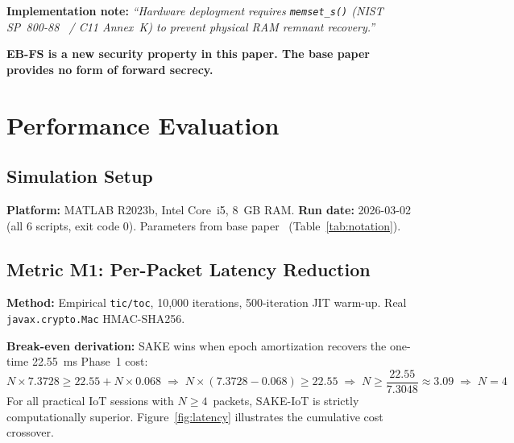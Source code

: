 \documentclass[conference]{IEEEtran}
\begin{document}
\noindent\textbf{Implementation note:}
\emph{``Hardware deployment requires \texttt{memset\_s()} (NIST SP~800-88~\cite{nist80088}
/ C11 Annex~K) to prevent physical RAM remnant recovery.''}

\noindent\textbf{EB-FS is a new security property in this paper.
The base paper~\cite{kumari2022} provides no form of forward secrecy.}

\section{Performance Evaluation}
\label{sec:eval}

\subsection{Simulation Setup}

\textbf{Platform:} MATLAB R2023b, Intel Core~i5, 8~GB RAM.
\textbf{Run date:} 2026-03-02 (all 6 scripts, exit code 0).
Parameters from base paper~\cite{kumari2022} (Table~\ref{tab:notation}).

\subsection{Metric M1: Per-Packet Latency Reduction}

\textbf{Method:} Empirical \texttt{tic/toc}, 10,000 iterations,
500-iteration JIT warm-up. Real \texttt{javax.crypto.Mac} HMAC-SHA256.

\noindent\textbf{Break-even derivation:} SAKE wins when epoch amortization
recovers the one-time 22.55~ms Phase~1 cost:
\begin{equation}
N \times 7.3728 \geq 22.55 + N \times 0.068
\;\Rightarrow\;
N \times (7.3728 - 0.068) \geq 22.55
\;\Rightarrow\;
N \geq \frac{22.55}{7.3048} \approx 3.09
\;\Rightarrow\; N = 4
\end{equation}
For all practical IoT sessions with $N \geq 4$~packets, SAKE-IoT is
strictly computationally superior. Figure~\ref{fig:latency} illustrates
the cumulative cost crossover.
\end{document}
